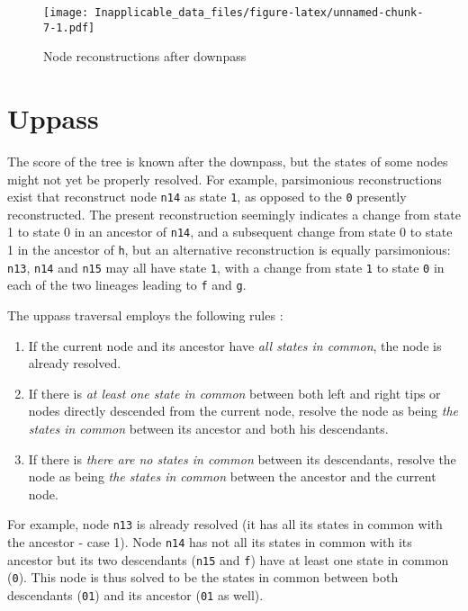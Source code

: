 \documentclass[]{book}
\providecommand{\tightlist}{%
  \setlength{\itemsep}{0pt}\setlength{\parskip}{0pt}}
\theoremstyle{definition}
\theoremstyle{definition}
\theoremstyle{definition}
\theoremstyle{remark}
\begin{document}
\begin{figure}
\centering
\texttt{[image: Inapplicable\_data\_files/figure-latex/unnamed-chunk-7-1.pdf]}
\caption{\label{fig:unnamed-chunk-7}Node reconstructions after downpass}
\end{figure}

\section{Uppass}\label{uppass}

The score of the tree is known after the downpass, but the states of
some nodes might not yet be properly resolved. For example, parsimonious
reconstructions exist that reconstruct node \texttt{n14} as state
\texttt{1}, as opposed to the \texttt{0} presently reconstructed. The
present reconstruction seemingly indicates a change from state 1 to
state 0 in an ancestor of \texttt{n14}, and a subsequent change from
state 0 to state 1 in the ancestor of \texttt{h}, but an alternative
reconstruction is equally parsimonious: \texttt{n13}, \texttt{n14} and
\texttt{n15} may all have state \texttt{1}, with a change from state
\texttt{1} to state \texttt{0} in each of the two lineages leading to
\texttt{f} and \texttt{g}.

The uppass traversal employs the following rules \citep{Fitch1971}:

\begin{enumerate}
\def\labelenumi{\arabic{enumi}.}
\tightlist
\item
  If the current node and its ancestor have \emph{all states in common},
  the node is already resolved.
\item
  If there is \emph{at least one state in common} between both left and
  right tips or nodes directly descended from the current node, resolve
  the node as being \emph{the states in common} between its ancestor and
  both his descendants.
\item
  If there is \emph{there are no states in common} between its
  descendants, resolve the node as being \emph{the states in common}
  between the ancestor and the current node.
\end{enumerate}

For example, node \texttt{n13} is already resolved (it has all its
states in common with the ancestor - case 1). Node \texttt{n14} has not
all its states in common with its ancestor but its two descendants
(\texttt{n15} and \texttt{f}) have at least one state in common
(\texttt{0}). This node is thus solved to be the states in common
between both descendants (\texttt{01}) and its ancestor (\texttt{01} as
well).
\end{document}
